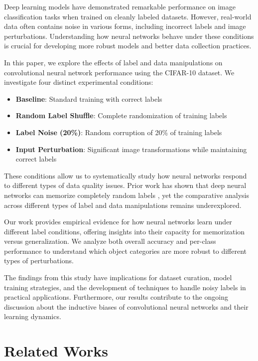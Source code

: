 \documentclass[10pt,twocolumn,letterpaper]{article}
\begin{document}
Deep learning models have demonstrated remarkable performance on image classification tasks when trained on cleanly labeled datasets.
However, real-world data often contains noise in various forms, including incorrect labels and image perturbations.
Understanding how neural networks behave under these conditions is crucial for developing more robust models and better data collection practices.

In this paper, we explore the effects of label and data manipulations on convolutional neural network performance using the CIFAR-10 dataset.
We investigate four distinct experimental conditions:

\begin{itemize}
    \item \textbf{Baseline}: Standard training with correct labels
    \item \textbf{Random Label Shuffle}: Complete randomization of training labels
    \item \textbf{Label Noise (20\%)}: Random corruption of 20\% of training labels
    \item \textbf{Input Perturbation}: Significant image transformations while maintaining correct labels
\end{itemize}

These conditions allow us to systematically study how neural networks respond to different types of data quality issues.
Prior work has shown that deep neural networks can memorize completely random labels \cite{zhang2021understanding}, yet the comparative analysis across different types of label and data manipulations remains underexplored.

Our work provides empirical evidence for how neural networks learn under different label conditions, offering insights into their capacity for memorization versus generalization.
We analyze both overall accuracy and per-class performance to understand which object categories are more robust to different types of perturbations.

The findings from this study have implications for dataset curation, model training strategies, and the development of techniques to handle noisy labels in practical applications.
Furthermore, our results contribute to the ongoing discussion about the inductive biases of convolutional neural networks and their learning dynamics.

\section{Related Works}
\label{sec:related}
\end{document}
